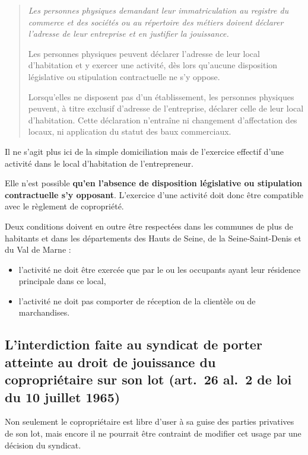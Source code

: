 				\begin{quote}
					\itshape
					Les personnes physiques demandant leur immatriculation au registre du commerce et des sociétés ou au répertoire des métiers doivent déclarer l'adresse de leur entreprise et en justifier la jouissance.
					
					Les personnes physiques peuvent déclarer l'adresse de leur local d'habitation et y exercer une activité, dès lors qu'aucune disposition législative ou stipulation contractuelle ne s'y oppose.
				
					Lorsqu'elles ne disposent pas d'un établissement, les personnes physiques peuvent, à titre exclusif d'adresse de l'entreprise, déclarer celle de leur local d'habitation. Cette déclaration n'entraîne ni changement d'affectation des locaux, ni application du statut des baux commerciaux.
				\end{quote}
				
				Il ne s’agit plus ici de la simple domiciliation mais de l’exercice effectif d’une activité dans le local d'habitation de l'entrepreneur.
				
				Elle n’est possible \textbf{qu’en l’absence de disposition législative ou stipulation contractuelle s’y opposant}. L’exercice d’une activité doit donc être compatible avec le règlement de copropriété.
				
				Deux conditions doivent en outre être respectées dans les communes de plus de  habitants et dans les départements des Hauts de Seine, de la Seine-Saint-Denis et du Val de Marne :
				\begin{itemize}
					\item l'activité ne doit être exercée que par le ou les occupants ayant leur résidence principale dans ce local,
					\item l'activité ne doit pas comporter de réception de la clientèle ou de marchandises.
				\end{itemize}
		
	\subsection{L’interdiction faite au syndicat de porter atteinte au droit de jouissance du copropriétaire sur son lot (art.~26 al.~2 de loi du 10 juillet 1965)}
		
		Non seulement le copropriétaire est libre d'user à sa guise des parties privatives de son lot, mais encore il ne pourrait être contraint de modifier cet usage par une décision du syndicat.
		
